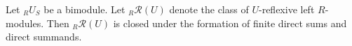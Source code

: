 Let ${}_R U_S$ be a bimodule. Let ${}_R \mathcal{R}(U)$ denote the class of $U$-reflexive left $R$-modules. Then ${}_R \mathcal{R}(U)$ is closed under the formation of finite direct sums and direct summands.
